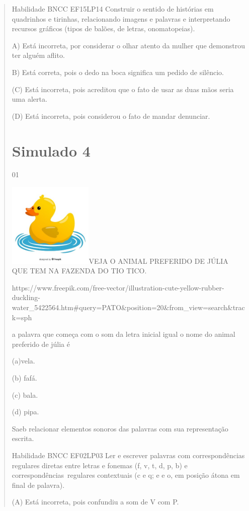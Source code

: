 {{{{\begin{verse}
{{\begin{escolha}
{{{{{Habilidade BNCC EF15LP14 Construir o sentido de histórias em quadrinhos
e tirinhas, relacionando imagens e palavras e interpretando recursos
gráficos (tipos de balões, de letras, onomatopeias).

A) Está incorreta, por considerar o olhar atento da mulher que
demonstrou ter alguém aflito.

B) Está correta, pois o dedo na boca significa um pedido de silêncio.

(C) Está incorreta, pois acreditou que o fato de usar as duas mãos seria
uma alerta.

(D) Está incorreta, pois considerou o fato de mandar denunciar.

\chapter{Simulado 4}

\num{01}

\includegraphics[width=1.58974in,height=1.58974in]{media/image174.jpeg}VEJA
O ANIMAL PREFERIDO DE JÚLIA QUE TEM NA FAZENDA DO TIO TICO.

https://www.freepik.com/free-vector/illustration-cute-yellow-rubber-duckling-water\_5422564.htm\#query=PATO\&position=20\&from\_view=search\&track=sph

a palavra que começa com o som da letra inicial igual o nome do animal
preferido de júlia é

(a)vela.

(b) fafá.

(c) bala.

(d) pipa.

Saeb relacionar elementos sonoros das palavras com sua representação
escrita.

Habilidade BNCC EF02LP03 Ler e escrever palavras com correspondências
regulares diretas entre letras e fonemas (f, v, t, d, p, b) e
correspondências~regulares contextuais (c e q; e e o, em posição átona
em final de palavra).

(A) Está incorreta, pois confundiu a som de V com P.

}}}}}
\end{escolha}}}
\end{verse}}}}}
